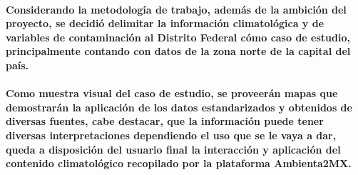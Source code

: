     \paragraph{Considerando la metodología de trabajo, además de la ambición del proyecto, se decidió delimitar la información climatológica y de variables de contaminación al Distrito Federal cómo caso de estudio, principalmente contando con datos de la zona norte de la capital del país.}
    \paragraph{Como muestra visual del caso de estudio, se proveerán mapas que demostrarán la aplicación de los datos estandarizados y obtenidos de diversas fuentes, cabe destacar, que la información puede tener diversas interpretaciones dependiendo el uso que se le vaya a dar, queda a disposición del usuario final la interacción y aplicación del contenido climatológico recopilado por la plataforma Ambienta2MX.}

